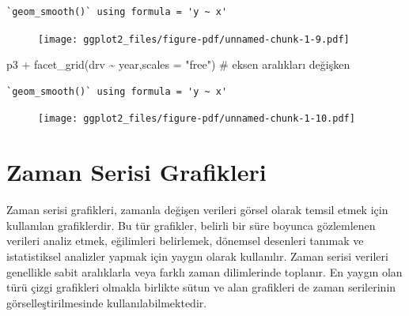 \documentclass[
  letterpaper,
  DIV=11,
  numbers=noendperiod]{scrreprt}
\newenvironment{Shaded}{\begin{snugshade}}{\end{snugshade}}
\newcommand{\AttributeTok}[1]{\textcolor[rgb]{0.40,0.45,0.13}{#1}}
\newcommand{\CommentTok}[1]{\textcolor[rgb]{0.37,0.37,0.37}{#1}}
\newcommand{\FunctionTok}[1]{\textcolor[rgb]{0.28,0.35,0.67}{#1}}
\newcommand{\NormalTok}[1]{\textcolor[rgb]{0.00,0.23,0.31}{#1}}
\newcommand{\SpecialCharTok}[1]{\textcolor[rgb]{0.37,0.37,0.37}{#1}}
\newcommand{\StringTok}[1]{\textcolor[rgb]{0.13,0.47,0.30}{#1}}
\begin{document}
\begin{verbatim}
`geom_smooth()` using formula = 'y ~ x'
\end{verbatim}

\begin{figure}[H]

{\centering \texttt{[image: ggplot2\_files/figure-pdf/unnamed-chunk-1-9.pdf]}

}

\end{figure}

\begin{Shaded}
\begin{Highlighting}[]
\NormalTok{p3 }\SpecialCharTok{+} \FunctionTok{facet\_grid}\NormalTok{(drv }\SpecialCharTok{\textasciitilde{}}\NormalTok{ year,}\AttributeTok{scales =} \StringTok{"free"}\NormalTok{) }\CommentTok{\# eksen aralıkları değişken}
\end{Highlighting}
\end{Shaded}

\begin{verbatim}
`geom_smooth()` using formula = 'y ~ x'
\end{verbatim}

\begin{figure}[H]

{\centering \texttt{[image: ggplot2\_files/figure-pdf/unnamed-chunk-1-10.pdf]}

}

\end{figure}

\hypertarget{zaman-serisi-grafikleri}{%
\section*{Zaman Serisi Grafikleri}\label{zaman-serisi-grafikleri}}


Zaman serisi grafikleri, zamanla değişen verileri görsel olarak temsil
etmek için kullanılan grafiklerdir. Bu tür grafikler, belirli bir süre
boyunca gözlemlenen verileri analiz etmek, eğilimleri belirlemek,
dönemsel desenleri tanımak ve istatistiksel analizler yapmak için yaygın
olarak kullanılır. Zaman serisi verileri genellikle sabit aralıklarla
veya farklı zaman dilimlerinde toplanır. En yaygın olan türü çizgi
grafikleri olmakla birlikte sütun ve alan grafikleri de zaman
serilerinin görselleştirilmesinde kullanılabilmektedir.
\end{document}
